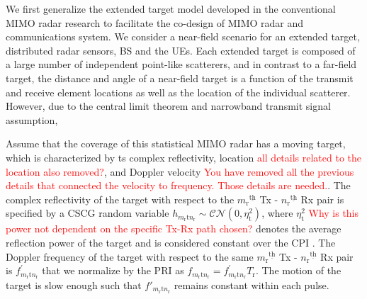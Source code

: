 \documentclass[9pt,journal]{IEEEtran}
\newcommand{\ith}[1]    {{#1}^{\underline{\text{th}}}}
\newcommand{\rr}{_\mathrm{r}}
\newcommand{\target}{\mathrm{t}}
\theoremstyle{definition}
\begin{document}
We first generalize the extended target model developed in the conventional MIMO radar research \cite{MIMOradarseparatedantennas,target_localization,widely_extendedtarget} to facilitate the co-design of MIMO radar and communications system. We consider a near-field scenario for an extended target, distributed radar sensors, BS and the UEs. Each extended target is composed of a large number of independent point-like scatterers, and in contrast to a far-field target, the distance and angle of a near-field target is a function of the transmit and receive element locations as well as the location of the individual scatterer\cite{MIMOradarseparatedantennas}. However, due to the central limit theorem and narrowband transmit signal assumption, 
\fi

Assume that the coverage of this statistical MIMO radar has a moving target, which is characterized by ts complex reflectivity, location \textcolor{red}{all details related to the location also removed?}, and Doppler velocity \textcolor{red}{You have removed all the previous details that connected the velocity to frequency. Those details are needed.}. The complex reflectivity of the target with respect to the $\ith{m\rr}$ Tx - $\ith{n\rr}$ Rx pair is specified by a CSCG random variable $h_{m\rr \target n\rr }\sim\mathcal{CN}(0,\eta^2_{\target})$, where $\eta^2_{\target}$ \textcolor{red}{Why is this power not dependent on the specific Tx-Rx path chosen?} denotes the average reflection power of the target and is considered constant over the CPI \cite{sun2019target}. The Doppler frequency of the target with respect to the same $\ith{m\rr}$ Tx - $\ith{n\rr}$ Rx pair is $f^\prime_{m_\mathrm{r}\target n_\mathrm{r}}$ that we normalize by the PRI as $f_{m_\mathrm{r}\target n_\mathrm{r}}= f^\prime_{m_\mathrm{r}\target n_\mathrm{r}}\mathit{T}\rr$\cite{hongbin_movingtarget}. The motion of the target is slow enough such that $f'_{m_\mathrm{r}\target n_\mathrm{r}}$ remains constant within each pulse. %
\end{document}

